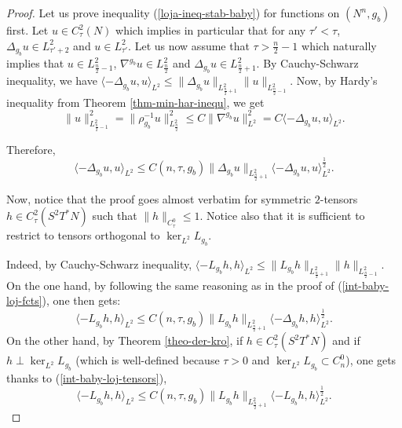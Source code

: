\documentclass[a4paper,11pt,reqno]{amsart}
\numberwithin{equation}{section}
\begin{document}
	\begin{proof}
		Let us prove inequality (\ref{loja-ineq-stab-baby}) for functions on $(N^n,g_b)$ first. Let $u\in C_{\tau}^{2}(N)$ which implies in particular that for any $\tau'<\tau$, $\Delta_{g_b} u\in L^2_{\tau'+2}$ and $u\in L^2_{\tau'}$. Let us now assume that $\tau>\frac{n}{2}-1$ which naturally implies that $u\in L^2_{\frac{n}{2}-1}$, $\nabla^{g_b} u\in L^2_{\frac{n}{2}}$ and $\Delta_{g_b} u \in L^2_{\frac{n}{2}+1}$. By Cauchy-Schwarz inequality, we have $\langle-\Delta_{g_b} u,u\rangle_{L^2}\leq \|\Delta_{g_b} u\|_{L^2_{\frac{n}{2}+1}}\|u\|_{L^2_{\frac{n}{2}-1}}$. Now, by Hardy's inequality from Theorem \ref{thm-min-har-inequ}, we get
		\begin{equation*}
		\|u\|_{L^2_{\frac{n}{2}-1}}^2 = \|\rho_{g_b}^{-1}u\|_{L^2_{\frac{n}{2}}}^2\leq C \|\nabla^{g_b}u\|^2_{L^2} = C\langle-\Delta_{g_b} u,u\rangle_{L^2}.
		\end{equation*}
		
		Therefore, 
		\begin{equation}
		\langle-\Delta_{g_b} u,u\rangle_{L^2}\leq C(n,\tau,g_b)\|\Delta_{g_b} u\|_{L^2_{\frac{n}{2}+1}}\langle-\Delta_{g_b} u,u\rangle_{L^2}^\frac{1}{2}.\label{int-baby-loj-fcts}
		\end{equation}
		
		Now, notice that the proof goes almost verbatim for symmetric $2$-tensors $h\in C_{\tau}^{2}(S^2T^*N)$ such that $\|h\|_{C_{\tau}^0}\leq 1$. Notice also that it is sufficient to restrict to tensors orthogonal to $\ker_{L^2}L_{g_b}$.
		
		Indeed, by Cauchy-Schwarz inequality, $\langle-L_{g_b} h,h\rangle_{L^2}\leq \|L_{g_b} h\|_{L^2_{\frac{n}{2}+1}}\|h\|_{L^2_{\frac{n}{2}-1}}$. On the one hand, by following the same reasoning as in the proof of (\ref{int-baby-loj-fcts}), one then gets:
		\begin{equation}
		\langle-L_{g_b} h,h\rangle_{L^2}\leq C(n,\tau,g_b)\|L_{g_b} h\|_{L^2_{\frac{n}{2}+1}}\langle-\Delta_{g_b} h,h\rangle_{L^2}^\frac{1}{2}.\label{int-baby-loj-tensors}
		\end{equation}
		On the other hand, by Theorem \ref{theo-der-kro}, if $h\in C^{2}_{\tau}(S^2T^*N)$ and if $h\perp\ker_{L^2}L_{g_b}$ (which is well-defined because $\tau>0$ and $\ker_{L^2}L_{g_b}\subset C^0_n$), one gets thanks to (\ref{int-baby-loj-tensors}), 
		\begin{equation}
		\langle-L_{g_b} h,h\rangle_{L^2}\leq C(n,\tau,g_b)\|L_{g_b} h\|_{L^2_{\frac{n}{2}+1}}\langle-L_{g_b} h,h\rangle_{L^2}^\frac{1}{2}.\label{int-baby-loj-tensors-bis}
		\end{equation}
	\end{proof}
	
\end{document}
